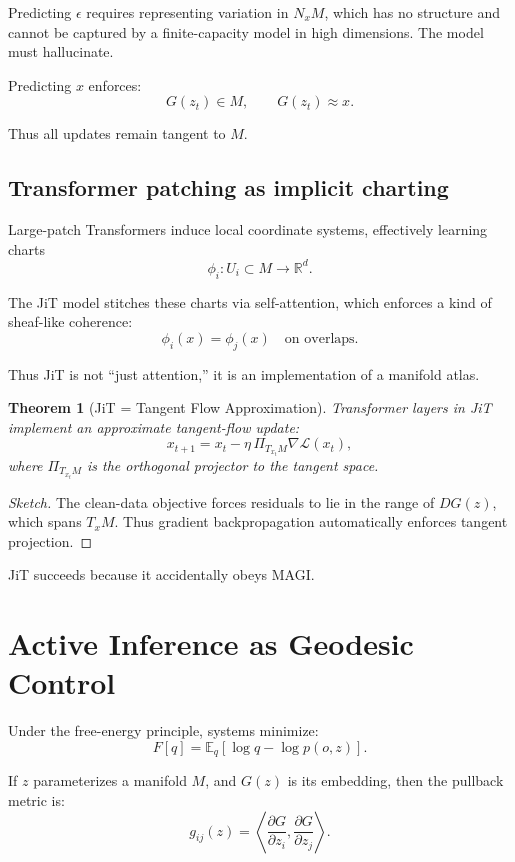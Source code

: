 \documentclass[11pt,a4paper,twocolumn]{article}
\newtheorem{theorem}{Theorem}[section]
\begin{document}
Predicting $\epsilon$ requires representing variation in $N_x M$, which
has no structure and cannot be captured by a finite-capacity model in
high dimensions. The model must hallucinate.

Predicting $x$ enforces:
\[
G(z_t) \in M,
\qquad
G(z_t) \approx x.
\]

Thus all updates remain tangent to $M$.

\subsection{Transformer patching as implicit charting}

Large-patch Transformers induce local coordinate systems, effectively
learning charts
\[
\phi_i : U_i \subset M \to \mathbb{R}^d.
\]

The JiT model stitches these charts via self-attention, which enforces a
kind of sheaf-like coherence:
\[
\phi_i(x) = \phi_j(x) \quad \text{on overlaps.}
\]

Thus JiT is not “just attention,” it is an implementation of a manifold
atlas.

\begin{theorem}[JiT = Tangent Flow Approximation]
Transformer layers in JiT implement an approximate tangent-flow update:
\[
x_{t+1} = x_t - \eta \,\Pi_{T_{x_t} M} \nabla \mathcal{L}(x_t),
\]
where $\Pi_{T_{x_t} M}$ is the orthogonal projector to the tangent
space.
\end{theorem}

\begin{proof}[Sketch]
The clean-data objective forces residuals to lie in the range of
$DG(z)$, which spans $T_x M$.  
Thus gradient backpropagation automatically enforces tangent projection.
\end{proof}

JiT succeeds because it accidentally obeys MAGI.


\section{Active Inference as Geodesic Control}

Under the free-energy principle, systems minimize:
\[
F[q] = \mathbb{E}_q[\log q - \log p(o,z)].
\]

If $z$ parameterizes a manifold $M$, and $G(z)$ is its embedding, then
the pullback metric is:
\[
g_{ij}(z) = \left\langle 
\frac{\partial G}{\partial z_i},
\frac{\partial G}{\partial z_j}
\right\rangle.
\]
\end{document}
